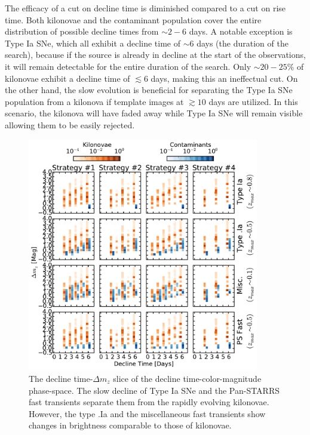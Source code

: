 The efficacy of a cut on decline time is diminished compared to a cut on rise time. Both kilonovae and the contaminant population cover the entire distribution of possible decline times from $\sim2-6$ days. A notable exception is Type Ia SNe, which all exhibit a decline time of $\sim6$ days (the duration of the search), because if the source is already in decline at the start of the observations, it will remain detectable for the entire duration of the search. Only $\sim20-25\%$ of kilonovae exhibit a decline time of $\lesssim6$ days, making this an ineffectual cut. On the other hand, the slow evolution is beneficial for separating the Type Ia SNe population from a kilonova if template images at $\gtrsim 10$ days are utilized. In this scenario, the kilonova will have faded away while Type Ia SNe will remain visible allowing them to be easily rejected. 

\begin{figure}[t!]
\centering
\includegraphics[width=0.9\textwidth]{./figs/chapter2/ch2_f11.pdf}
\caption{The decline time-$\Delta m_z$ slice of the decline time-color-magnitude phase-space. The slow decline of Type Ia SNe and the Pan-STARRS fast transients separate them from the rapidly evolving kilonovae. However, the type .Ia and the miscellaneous fast transients show changes in brightness comparable to those of kilonovae.}
\label{fig:decdm}
\end{figure}
   
